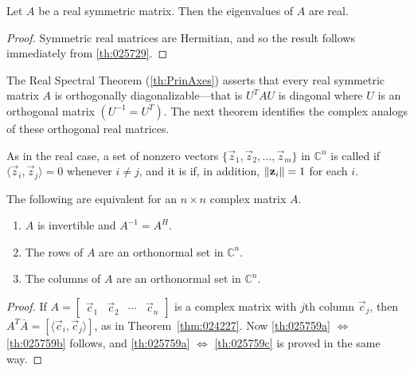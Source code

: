 \documentclass{ximera}
\begin{document}
\begin{corollary}\label{cor:ews_symmetric_real}
    Let $A$ be a real symmetric matrix.  Then the eigenvalues of $A$ are real.
\end{corollary}

\begin{proof}
    Symmetric real matrices are Hermitian, and so the result follows immediately from \ref{th:025729}.
\end{proof}

The Real Spectral Theorem (\ref{th:PrinAxes}) asserts that every real symmetric matrix $A$ is orthogonally diagonalizable---that is $U^{T}AU$ is diagonal where $U$ is an orthogonal matrix $(U^{-1} = U^{T})$. The next theorem identifies the complex analogs of these orthogonal real matrices.

\begin{definition}\label{def:025749}
As in the real case, a set of nonzero vectors $\{\vec{z}_{1}, \vec{z}_{2}, \ldots, \vec{z}_{m}\}$ in $\mathbb{C}^n$ is called  if $\langle \vec{z}_{i}, \vec{z}_{j}\rangle = 0$ whenever $i \neq j$, and it is  if, in addition, $\left\lVert\mathbf{z}_{i} \right\rVert = 1$ for each $i$.
\end{definition}

\begin{theorem}\label{th:025759}
The following are equivalent for an $n \times n$ complex matrix $A$.

\begin{enumerate}
\item\label{th:025759a} $A$ is invertible and $A^{-1} = A^{H}$.

\item\label{th:025759b} The rows of $A$ are an orthonormal set in $\mathbb{C}^n$.

\item\label{th:025759c} The columns of $A$ are an orthonormal set in $\mathbb{C}^n$.

\end{enumerate}
\end{theorem}

\begin{proof}
If $A = \left[ \begin{array}{cccc}
\vec{c}_{1} & \vec{c}_{2} & \cdots & \vec{c}_{n}
\end{array}\right]$ is a complex matrix with $j$th column $\vec{c}_{j}$, then $A^T\overline{A} = \left[ \langle \vec{c}_{i}, \vec{c}_{j}\rangle \right]$, as in Theorem~\ref{thm:024227}. Now \ref{th:025759a} $\Leftrightarrow$ \ref{th:025759b} follows, and \ref{th:025759a} $\Leftrightarrow$ \ref{th:025759c} is proved in the same way.
\end{proof}
\end{document}
